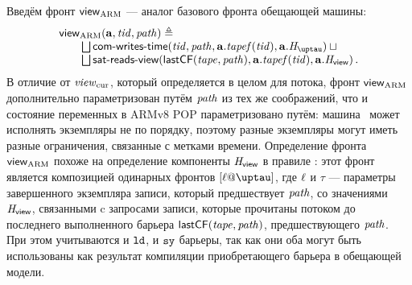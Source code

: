 Введём фронт $\mathsf{view}_{\text{ARM}}$ --- аналог базового фронта обещающей машины:
$$
\begin{array}{l}
\Rarm(\aT, \tId, \cpath) \triangleq \\
\qquad \bigsqcup \opstau(\tId, \cpath, \aT.\tapef(\tId), \aT.\tmap) \sqcup {}\\
\qquad \bigsqcup \readsSatisfiedR(\lastCF(\tape, \cpath), \aT.\tapef(\tId), \aT.\rmap) \,.\\
\end{array}
$$
В отличие от  $\mathit{view}_{\mathrm{cur}}$, который определяется в целом для потока,
фронт $\mathsf{view}_{\text{ARM}}$ дополнительно параметризован путём $\mathit{path}$ из тех же соображений,
что и состояние переменных в ARMv8 POP параметризовано путём: машина \ARMt~может
исполнять экземпляры не по порядку, поэтому разные экземпляры могут иметь разные ограничения,
связанные с метками времени.
Определение фронта $\mathsf{view}_{\text{ARM}}$ похоже на определение компоненты $\mathit{H}_{\mathsf{view}}$
в правиле :
этот фронт является композицией одинарных фронтов $[\loc@\tau]$, где $\ell$ и $\tau$ ---
параметры завершенного экземпляра записи, который предшествует $\mathit{path}$,
со значениями $\mathit{H}_{\mathsf{view}}$, связанными c запросами записи,
которые прочитаны потоком до последнего выполненного барьера $\mathsf{lastCF}(\mathit{tape}, \mathit{path})$,
предшествующего $\mathit{path}$.
При этом учитываются и $\mathtt{ld}$, и $\mathtt{sy}$ барьеры, так как они оба
могут быть использованы как результат компиляции приобретающего барьера
в обещающей модели.

